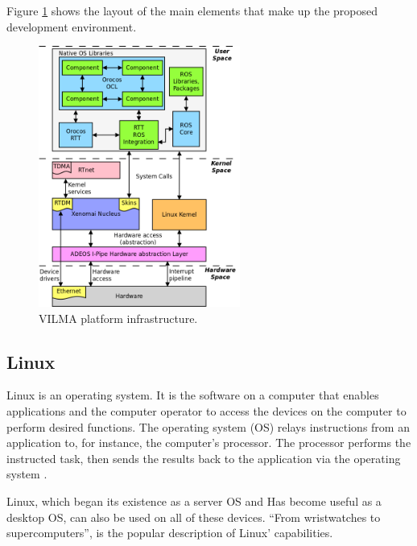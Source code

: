 \documentclass[conference]{IEEEtran}
\begin{document}
Figure \ref{fig:VILMA_ENV_OVERVIEW_NET} shows the layout of the main elements that make up the proposed development environment.

\begin{figure}[h]
	\centering
	\includegraphics[width=250px,keepaspectratio]{imagens/VILMA_ENV_OVERVIEW_NET.png}
	\caption{VILMA platform infrastructure.}
	\label{fig:VILMA_ENV_OVERVIEW_NET}
\end{figure}

%
\subsection{Linux}\label{subsec:linux}

Linux is an operating system. It is the software on a computer that enables applications and the computer operator to access the devices on the computer to perform desired functions. The operating system (OS) relays instructions from an application to, for instance, the computer's processor. The processor performs the instructed task, then sends the results back to the application via the operating system \cite{linux_barabanov1997}.


Linux, which began its existence as a server OS and Has become useful as a desktop OS, can also be used on all of these devices. “From wristwatches to supercomputers”, is the popular description of Linux' capabilities. \cite{linux_foundation}
\end{document}

